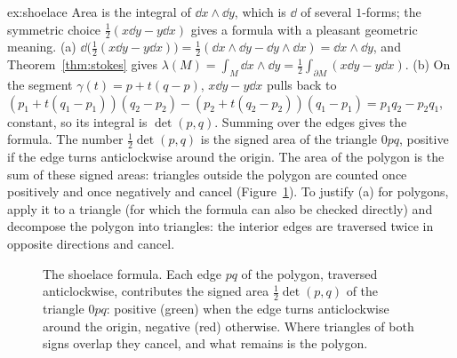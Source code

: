 \begin{solution}{ex:shoelace}
\idea Area is the integral of $\dd x\wedge\dd y$, which is $\dd$ of several $1$-forms; the symmetric choice $\frac12(x\dd y-y\dd x)$ gives a formula with a pleasant geometric meaning.
\writeup (a) $\dd\bigl(\frac12(x\dd y-y\dd x)\bigr)=\frac12(\dd x\wedge\dd y-\dd y\wedge\dd x)=\dd x\wedge\dd y$, and Theorem~\ref{thm:stokes} gives
$\lambda(M)=\int_M\dd x\wedge\dd y=\frac12\int_{\partial M}(x\dd y-y\dd x)$. (b) On the segment $\gamma(t)=p+t(q-p)$, $x\dd y-y\dd x$ pulls back to
$(p_1+t(q_1-p_1))(q_2-p_2)-(p_2+t(q_2-p_2))(q_1-p_1)=p_1q_2-p_2q_1$, constant, so its integral is $\det(p,q)$. Summing over the edges gives the formula. The
number $\frac12\det(p,q)$ is the signed area of the triangle $0pq$, positive if the edge turns anticlockwise around the origin. The area of the polygon is the sum
of these signed areas: triangles outside the polygon are counted once positively and once negatively and cancel (Figure~\ref{fig:shoelace}). To justify
(a) for polygons, apply it to a triangle (for which the formula can also be checked directly) and decompose the polygon into triangles: the interior
edges are traversed twice in opposite directions and cancel.
\end{solution}

\begin{figure}[ht]
\centering
{}
\caption{The shoelace formula. Each edge $pq$ of the polygon, traversed anticlockwise, contributes the signed area $\frac12\det(p,q)$ of the triangle $0pq$:
positive (green) when the edge turns anticlockwise around the origin, negative (red) otherwise. Where triangles of both signs overlap they cancel, and what
remains is the polygon.}
\label{fig:shoelace}
\end{figure}

